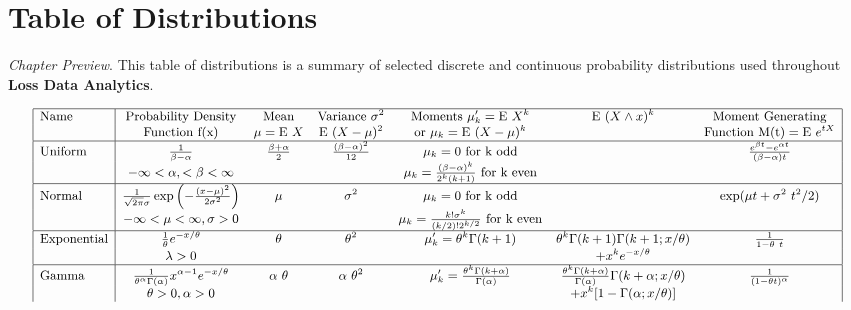 \documentclass[]{book}
\theoremstyle{definition}
\theoremstyle{definition}
\theoremstyle{definition}
\theoremstyle{remark}
\begin{document}
\chapter{Table of Distributions}\label{table-of-distributions}

\emph{Chapter Preview}. This table of distributions is a summary of
selected discrete and continuous probability distributions used
throughout \textbf{Loss Data Analytics}.

\[
{\small
\begin{matrix}
\begin{array}{|l|cccccc|}
\hline
      \text{Name} & \text{Probability Density}  &       \text{Mean} & \text{Variance } \sigma^2 & \text{Moments } \mu_k'=\mathrm{E~}X^k & \mathrm{E~}(X\wedge x)^k & \text{Moment Generating} \\
           & \text{Function f(x)}  & \mu=\mathrm{E~}X & \mathrm{E~}(X-\mu)^2 & \text{or } \mu_k=\mathrm{E~}(X-\mu)^k &            & \text{Function M(t)}=\mathrm{E~}e^{tX} \\
\hline
   \text{Uniform} & \frac{1}{\beta-\alpha} & \frac{\beta+\alpha}{2} & \frac{(\beta-\alpha)^2}{12} & \mu_k=0 \text{ for k odd} &            & \frac{e^{\beta t}-e^{\alpha t}}{(\beta-\alpha)t} \\
           & -\infty<\alpha, <\beta<\infty &  & & \mu_k=\frac{(\beta-\alpha)^k}{2^k(k+1)} \text{ for k even} &            & \\
\hline
    \text{Normal} & \frac{1}{\sqrt{2\pi}\sigma}\exp\left( -\frac{(x-\mu)^2}{2\sigma^2}\right)  &     \mu & \sigma^2 & \mu_k=0 \text{ for k odd} &            & \exp(\mu t+\sigma^2~t^2/2) \\
           & -\infty<\mu<\infty, \sigma>0  &            &            & \mu_k=\frac{k!\sigma^k}{(k/2)!2^{k/2}} \text{ for k even} &            &            \\
\hline
\text{Exponential} & \frac{1}{\theta}e^{-x/\theta} &  \theta & \theta^2 & \mu_k'=\theta^k \Gamma (k+1) & \theta^k\Gamma (k+1)\Gamma (k+1;x/\theta) & \frac{1}{1-\theta~t} \\
           & \lambda>0 &            &            &            & +x^k e^{-x/\theta} & \\
\hline
     \text{Gamma} & \frac{1}{\theta^{\alpha}\Gamma(\alpha)}x^{\alpha-1}e^{-x/\theta} & \alpha~\theta & \alpha~\theta^2 & \mu_k'=\frac{\theta^k\Gamma(k+\alpha)}{\Gamma(\alpha)} & \frac{\theta^k\Gamma(k+\alpha)}{\Gamma(\alpha)}\Gamma(k+\alpha; x/\theta) & \frac{1}{(1-\theta t)^{\alpha}} \\
           & \theta>0, \alpha>0 &            &            & & +x^k[1-\Gamma(\alpha; x/\theta)] & \\

\end{array}
\end{matrix}}\]
\end{document}
